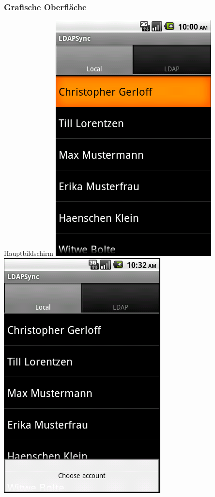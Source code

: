 \documentclass[hyperref={bookmarksopen=false}]{beamer}
\begin{document}
\begin{frame}[fragile]
	\frametitle{Grafische Oberfläche}
	\begin{block}{Hauptbildschirm}
	\hspace{0.5 cm}
	\includegraphics[scale=0.3]{LocalTabView.png}
	\vspace{1 cm}
	\includegraphics[scale=0.3]{LocalTabView_MenuOpen.png}

\end{block}
\end{frame}
\end{document}
